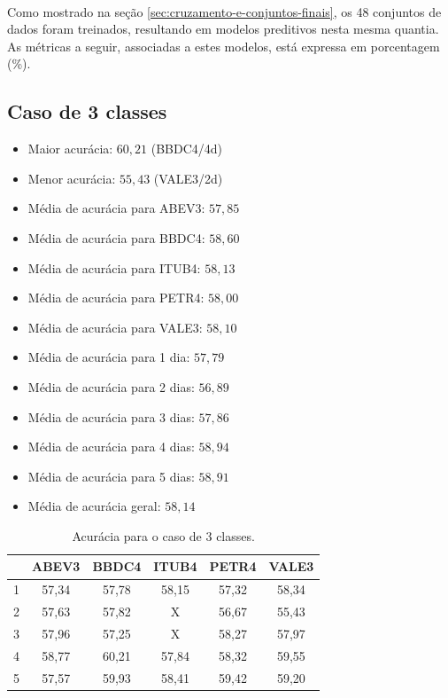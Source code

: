 \documentclass[grad,numbers]{coppe}
\begin{document}
 			\paragraph{}Como mostrado na seção \ref{sec:cruzamento-e-conjuntos-finais}, os 48 conjuntos de dados foram treinados, resultando em modelos preditivos nesta mesma quantia. As métricas a seguir, associadas a estes modelos, está expressa em porcentagem (\%).
 			\subsection{Caso de 3 classes}
	 			\begin{itemize}
	 				\item Maior acurácia: $60,21$ (BBDC4/4d)
	 				\item Menor acurácia: $55,43$ (VALE3/2d)
	 				\item Média de acurácia para ABEV3: $57,85$
	 				\item Média de acurácia para BBDC4: $58,60$
	 				\item Média de acurácia para ITUB4: $58,13$
	 				\item Média de acurácia para PETR4: $58,00$
	 				\item Média de acurácia para VALE3: $58,10$
	 				\item Média de acurácia para 1 dia: $57,79$
	 				\item Média de acurácia para 2 dias: $56,89$
	 				\item Média de acurácia para 3 dias: $57,86$
	 				\item Média de acurácia para 4 dias: $58,94$
	 				\item Média de acurácia para 5 dias: $58,91$
	 				\item Média de acurácia geral: $58,14$
	 			\end{itemize}
	 			\begin{table}[h]
	 				\caption{Acurácia para o caso de 3 classes.}
	 				\label{tab:3c_ac_analysis}
	 				\centering
	 				{\footnotesize
	 					\begin{tabular}{|c|c|c|c|c|c|}
	 						\hline
	 						\diagbox[linewidth=0.2pt, width=\dimexpr \textwidth/10+2\tabcolsep\relax, height=0.8cm]{Dias}{Ativo}
	 						& ABEV3 & BBDC4 & ITUB4 & PETR4 & VALE3\\
	 						\hline
	 						1 & 57,34 & 57,78 & 58,15 & 57,32 & 58,34 \\
	 						2 & 57,63 & 57,82 & X     & 56,67 & 55,43 \\
	 						3 & 57,96 & 57,25 & X     & 58,27 & 57,97 \\
	 						4 & 58,77 & 60,21 & 57,84 & 58,32 & 59,55 \\
	 						5 & 57,57 & 59,93 & 58,41 & 59,42 & 59,20 \\
	 						\hline
	 				\end{tabular}}
	 			\end{table}
\end{document}
